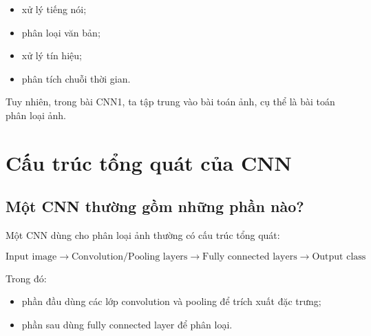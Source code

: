 \documentclass[12pt,a4paper]{report}
\begin{document}
\begin{itemize}
    \item xử lý tiếng nói;
    \item phân loại văn bản;
    \item xử lý tín hiệu;
    \item phân tích chuỗi thời gian.
\end{itemize}

Tuy nhiên, trong bài CNN1, ta tập trung vào bài toán ảnh, cụ thể là bài toán phân loại ảnh.

\chapter{Cấu trúc tổng quát của CNN}

\section{Một CNN thường gồm những phần nào?}

Một CNN dùng cho phân loại ảnh thường có cấu trúc tổng quát:

\[
    \text{Input image}
    \rightarrow
    \text{Convolution/Pooling layers}
    \rightarrow
    \text{Fully connected layers}
    \rightarrow
    \text{Output class}
\]

Trong đó:

\begin{itemize}
    \item phần đầu dùng các lớp convolution và pooling để trích xuất đặc trưng;
    \item phần sau dùng fully connected layer để phân loại.
\end{itemize}

\begin{center}
\end{center}
\end{document}
